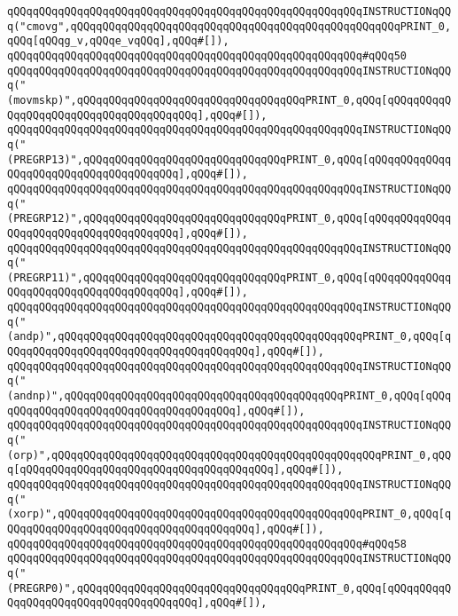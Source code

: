 \verb|qQQqqQQqqQQqqQQqqQQqqQQqqQQqqQQqqQQqqQQqqQQqqQQqqQQqqQQqINSTRUCTIONqQQq("cmovg",qQQqqQQqqQQqqQQqqQQqqQQqqQQqqQQqqQQqqQQqqQQqqQQqqQQqPRINT_0,qQQq[qQQqg_v,qQQqe_vqQQq],qQQq#[]),|\newline
\verb|qQQqqQQqqQQqqQQqqQQqqQQqqQQqqQQqqQQqqQQqqQQqqQQqqQQqqQQq#qQQq50|\newline
\verb|qQQqqQQqqQQqqQQqqQQqqQQqqQQqqQQqqQQqqQQqqQQqqQQqqQQqqQQqINSTRUCTIONqQQq("(movmskp)",qQQqqQQqqQQqqQQqqQQqqQQqqQQqqQQqqQQqPRINT_0,qQQq[qQQqqQQqqQQqqQQqqQQqqQQqqQQqqQQqqQQqqQQq],qQQq#[]),|\newline
\verb|qQQqqQQqqQQqqQQqqQQqqQQqqQQqqQQqqQQqqQQqqQQqqQQqqQQqqQQqINSTRUCTIONqQQq("(PREGRP13)",qQQqqQQqqQQqqQQqqQQqqQQqqQQqqQQqPRINT_0,qQQq[qQQqqQQqqQQqqQQqqQQqqQQqqQQqqQQqqQQqqQQq],qQQq#[]),|\newline
\verb|qQQqqQQqqQQqqQQqqQQqqQQqqQQqqQQqqQQqqQQqqQQqqQQqqQQqqQQqINSTRUCTIONqQQq("(PREGRP12)",qQQqqQQqqQQqqQQqqQQqqQQqqQQqqQQqPRINT_0,qQQq[qQQqqQQqqQQqqQQqqQQqqQQqqQQqqQQqqQQqqQQq],qQQq#[]),|\newline
\verb|qQQqqQQqqQQqqQQqqQQqqQQqqQQqqQQqqQQqqQQqqQQqqQQqqQQqqQQqINSTRUCTIONqQQq("(PREGRP11)",qQQqqQQqqQQqqQQqqQQqqQQqqQQqqQQqPRINT_0,qQQq[qQQqqQQqqQQqqQQqqQQqqQQqqQQqqQQqqQQqqQQq],qQQq#[]),|\newline
\verb|qQQqqQQqqQQqqQQqqQQqqQQqqQQqqQQqqQQqqQQqqQQqqQQqqQQqqQQqINSTRUCTIONqQQq("(andp)",qQQqqQQqqQQqqQQqqQQqqQQqqQQqqQQqqQQqqQQqqQQqqQQqPRINT_0,qQQq[qQQqqQQqqQQqqQQqqQQqqQQqqQQqqQQqqQQqqQQq],qQQq#[]),|\newline
\verb|qQQqqQQqqQQqqQQqqQQqqQQqqQQqqQQqqQQqqQQqqQQqqQQqqQQqqQQqINSTRUCTIONqQQq("(andnp)",qQQqqQQqqQQqqQQqqQQqqQQqqQQqqQQqqQQqqQQqqQQqPRINT_0,qQQq[qQQqqQQqqQQqqQQqqQQqqQQqqQQqqQQqqQQqqQQq],qQQq#[]),|\newline
\verb|qQQqqQQqqQQqqQQqqQQqqQQqqQQqqQQqqQQqqQQqqQQqqQQqqQQqqQQqINSTRUCTIONqQQq("(orp)",qQQqqQQqqQQqqQQqqQQqqQQqqQQqqQQqqQQqqQQqqQQqqQQqqQQqPRINT_0,qQQq[qQQqqQQqqQQqqQQqqQQqqQQqqQQqqQQqqQQqqQQq],qQQq#[]),|\newline
\verb|qQQqqQQqqQQqqQQqqQQqqQQqqQQqqQQqqQQqqQQqqQQqqQQqqQQqqQQqINSTRUCTIONqQQq("(xorp)",qQQqqQQqqQQqqQQqqQQqqQQqqQQqqQQqqQQqqQQqqQQqqQQqPRINT_0,qQQq[qQQqqQQqqQQqqQQqqQQqqQQqqQQqqQQqqQQqqQQq],qQQq#[]),|\newline
\verb|qQQqqQQqqQQqqQQqqQQqqQQqqQQqqQQqqQQqqQQqqQQqqQQqqQQqqQQq#qQQq58|\newline
\verb|qQQqqQQqqQQqqQQqqQQqqQQqqQQqqQQqqQQqqQQqqQQqqQQqqQQqqQQqINSTRUCTIONqQQq("(PREGRP0)",qQQqqQQqqQQqqQQqqQQqqQQqqQQqqQQqqQQqPRINT_0,qQQq[qQQqqQQqqQQqqQQqqQQqqQQqqQQqqQQqqQQqqQQq],qQQq#[]),|\newline
